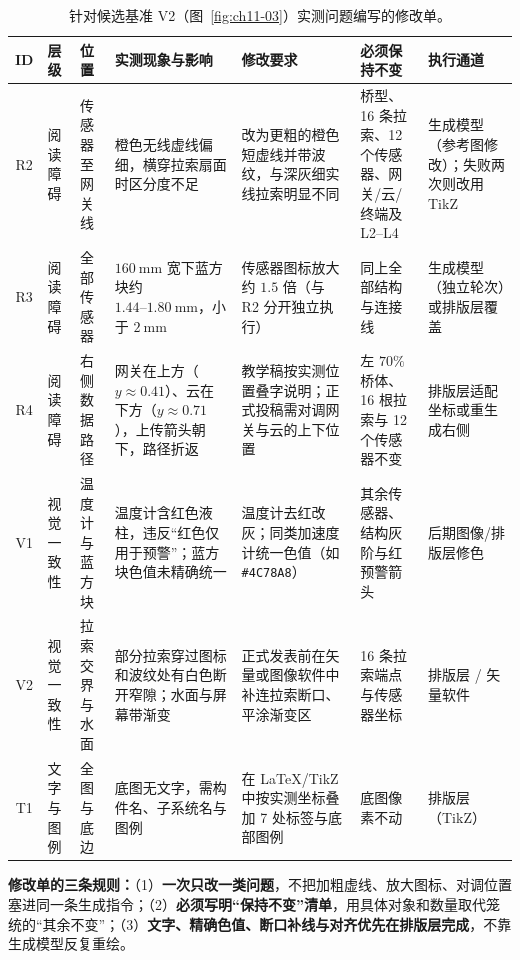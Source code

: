 \begin{table}[htbp]\centering\footnotesize
\setlength{\tabcolsep}{3pt}
\renewcommand{\arraystretch}{1.15}
\caption{针对候选基准 V2（图~\ref{fig:ch11-03}）实测问题编写的修改单。}\label{tab:ch11-03}
\begin{tabularx}{\linewidth}{@{}c>{\raggedright\arraybackslash}p{14mm}>{\raggedright\arraybackslash}p{18mm}YYY>{\raggedright\arraybackslash}p{18mm}@{}}
\toprule
\textbf{ID} & \textbf{层级} & \textbf{位置} & \textbf{实测现象与影响} & \textbf{修改要求} & \textbf{必须保持不变} & \textbf{执行通道} \\
\midrule
R2 & 阅读障碍 & 传感器至网关线 & 橙色无线虚线偏细，横穿拉索扇面时区分度不足 & 改为更粗的橙色短虚线并带波纹，与深灰细实线拉索明显不同 & 桥型、16 条拉索、12 个传感器、网关/云/终端及 L2--L4 & 生成模型（参考图修改）；失败两次则改用 TikZ \\
R3 & 阅读障碍 & 全部传感器 & $160\ \text{mm}$ 宽下蓝方块约 $1.44\text{--}1.80\ \text{mm}$，小于 $2\ \text{mm}$ & 传感器图标放大约 $1.5$ 倍（与 R2 分开独立执行） & 同上全部结构与连接线 & 生成模型（独立轮次）或排版层覆盖 \\
R4 & 阅读障碍 & 右侧数据路径 & 网关在上方（$y\approx 0.41$）、云在下方（$y\approx 0.71$），上传箭头朝下，路径折返 & 教学稿按实测位置叠字说明；正式投稿需对调网关与云的上下位置 & 左 $70\%$ 桥体、16 根拉索与 12 个传感器不变 & 排版层适配坐标或重生成右侧 \\
V1 & 视觉一致性 & 温度计与蓝方块 & 温度计含红色液柱，违反“红色仅用于预警”；蓝方块色值未精确统一 & 温度计去红改灰；同类加速度计统一色值（如 \texttt{\#4C78A8}） & 其余传感器、结构灰阶与红预警箭头 & 后期图像/排版层修色 \\
V2 & 视觉一致性 & 拉索交界与水面 & 部分拉索穿过图标和波纹处有白色断开窄隙；水面与屏幕带渐变 & 正式发表前在矢量或图像软件中补连拉索断口、平涂渐变区 & 16 条拉索端点与传感器坐标 & 排版层 / 矢量软件 \\
T1 & 文字与图例 & 全图与底边 & 底图无文字，需构件名、子系统名与图例 & 在 LaTeX/TikZ 中按实测坐标叠加 7 处标签与底部图例 & 底图像素不动 & 排版层（TikZ） \\
\bottomrule
\end{tabularx}
\end{table}

\begin{BookNote}
\textbf{修改单的三条规则：}（1）\textbf{一次只改一类问题}，不把加粗虚线、放大图标、对调位置塞进同一条生成指令；（2）\textbf{必须写明“保持不变”清单}，用具体对象和数量取代笼统的“其余不变”；（3）\textbf{文字、精确色值、断口补线与对齐优先在排版层完成}，不靠生成模型反复重绘。
\end{BookNote}

